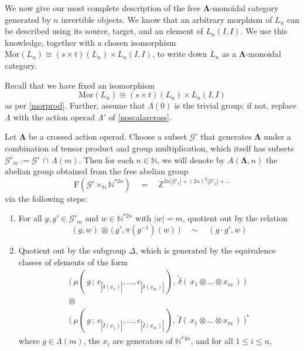 \documentclass{amsbook} %
\newcommand{\ML}{\mathbf{\Lambda}}
\newcommand{\MorLn}{\mathrm{Mor}(L_n)}
\newcommand{\LL}{\Lambda}
\numberwithin{section}{chapter}
\begin{document}
We now give our most complete description of the free $\ML$-monoidal category generated by $n$ invertible objects. We know that an arbitrary morphism of $L_n$ can be described using its source, target, and an element of $L_n(I,I)$. We use this knowledge, together with a chosen isomorphism $\MorLn \cong (s \times t)(L_n) \times L_n(I,I)$, to write down $L_n$ as a $\ML$-monoidal category.

\begin{conv}
Recall that we have fixed an isomorphism 
\[
\MorLn \cong (s \times t)(L_n) \times L_n(I,I)
\]
 as per \cref{morprod}. Further, assume that $\Lambda(0)$ is the trivial group; if not, replace $\Lambda$ with the action operad $\Lambda'$ of \cref{noscalarcross}.
\end{conv}

\begin{Defi} \label{AGndef} Let $\ML$ be a crossed action operad. Choose a subset $\mathcal{G}'$ that generates $\ML$ under a combination of tensor product and group multiplication, which itself has subsets $\mathcal{G}'_m := \mathcal{G}' \, \cap \, \Lambda(m)$. Then for each $n \in \mathbb{N}$, we will denote by $A(\ML,n)$ the abelian group obtained from the free abelian group 
\[ \mathrm{F}( \mathcal{G}' \times_{\mathbb{N}} \mathbb{N}^{\ast 2n}) \quad = \quad \mathbb{Z}^{2n|\mathcal{G}'_1| + (2n)^2|\mathcal{G}'_2| + \ldots} \]
via the following steps:
\begin{enumerate}
\item For all $g, g' \in \mathcal{G}'_m$ and $w \in \mathbb{N}^{\ast 2n}$ with $|w| = m$, quotient out by the relation 
\[ (g, w) \, \otimes \, \big( \, g', \pi(g^{-1})(w) \, \big) \quad \sim \quad (g \cdot g', w) \]
\item Quotient out by the subgroup $\Delta$, which is generated by the equivalence classes of elements of the form
\[ \begin{array}{c}
				\big( \, \mu( \, g \, ; \, e_{|\tilde{\delta}(x_1)|}, \ldots, e_{|\tilde{\delta}(x_m)|} \, ), \, \tilde{\delta}( \, x_1 \otimes \ldots \otimes x_m \, ) \, \big) \\
				\otimes \\
				\big( \, \mu( \, g \, ; \, e_{|\tilde{I}(x_1)|}, \ldots, e_{|\tilde{I}(x_m)|} \, ), \, \tilde{I}( \, x_1 \otimes \ldots \otimes x_m \, ) \, \big)^*
		\end{array} 
\]
where $g \in \LL(m)$, the $x_i$ are generators of $\mathbb{N}^{\ast 4n}$, and for all $1 \le i \le n$,
\[ \begin{array}{rclcrclcrclcrcl}

\end{array}\]
\end{enumerate}
\end{Defi}
\end{document}
